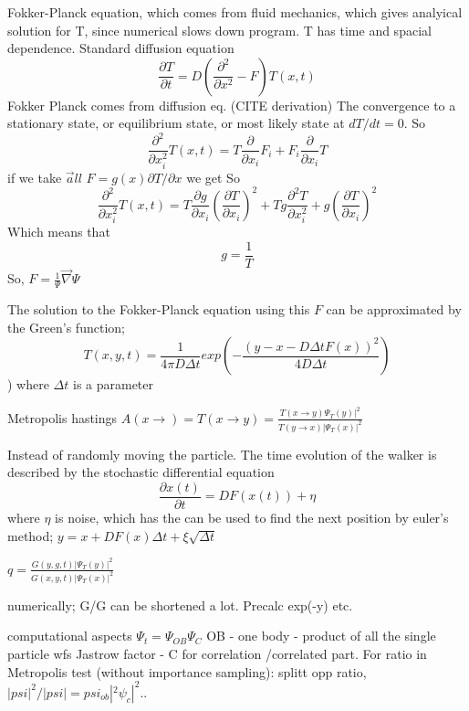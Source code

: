 \documentclass[%
oneside,                 %
final,                   %
10pt]{article}
\begin{document}
Fokker-Planck equation, which comes from fluid mechanics, which gives analyical solution for T, since numerical slows down program. T has time and spacial dependence.
Standard diffusion equation
\begin{equation}
\frac{\partial T}{\partial t} = D (\frac{\partial^2}{\partial x^2}-F) T(x,t)
\end{equation}
Fokker Planck comes from diffusion eq. (CITE derivation)
The convergence to a stationary state, or equilibrium state, or most likely state at $dT/dt=0$. 
So \begin{equation}
\frac{\partial^2}{\partial x_i^2} T(x,t) = T \frac{\partial}{\partial x_i} F_i + F_i \frac{\partial }{\partial x_i} T
\end{equation}
if we take $\vec all$ $F= g(x) \partial T/\partial x$
we get
So \begin{equation}
\frac{\partial^2}{\partial x_i^2} T(x,t) = T \frac{\partial g }{\partial x_i}( \frac{\partial T }{\partial x_i})^2  + T g  \frac{\partial^2 T }{\partial x_i^2} + g(\frac{\partial T}{\partial x_i})^2
\end{equation}
Which means that 
\begin{equation}
g=\frac{1}{T}
\end{equation}
So, $F=\frac{1}{\Psi}\vec \nabla \Psi$


The solution to the Fokker-Planck equation using this $F$ can be approximated by the Green's function;
\begin{equation}
T(x,y,t) = \frac{1}{4 \pi D \Delta t} exp\left(-\frac{(y-x-D\Delta t F(x))^2}{4D\Delta t}\right)
\end{equation}) 
where $\Delta t$ is a parameter


Metropolis hastings
$A(x\rightarrow )=T(x\rightarrow y)=\frac{T(x\rightarrow y) \Psi_T(y)|^2 }{T(y\rightarrow x)|\Psi_T(x)|^2}$

Instead of randomly moving the particle. The time evolution of the walker is described by the stochastic differential equation
\begin{equation}
\frac{\partial x(t)}{\partial t}=DF(x(t)) + \eta
\end{equation}
where $\eta$ is noise, which has the can be used to find the next position by euler's method;
$y=x+DF(x)\Delta t + \xi \sqrt{\Delta t}$

$q=\frac{G(y,g,t)|\Psi_T(y)|^2}{G(x,y,t)|\Psi_T(x)|^2}$


numerically; G/G can be shortened a lot. Precalc exp(-y) etc.

computational aspects
$\Psi_t=\Psi_{OB} \Psi_C$
OB - one body - product of all the single particle wfs 
Jastrow factor - C for correlation /correlated part. 
For ratio in Metropolis test (without importance sampling):
splitt opp ratio, $|psi|^2/|psi|=psi_{ob}|^2 \psi_c|^2..$
\end{document}
